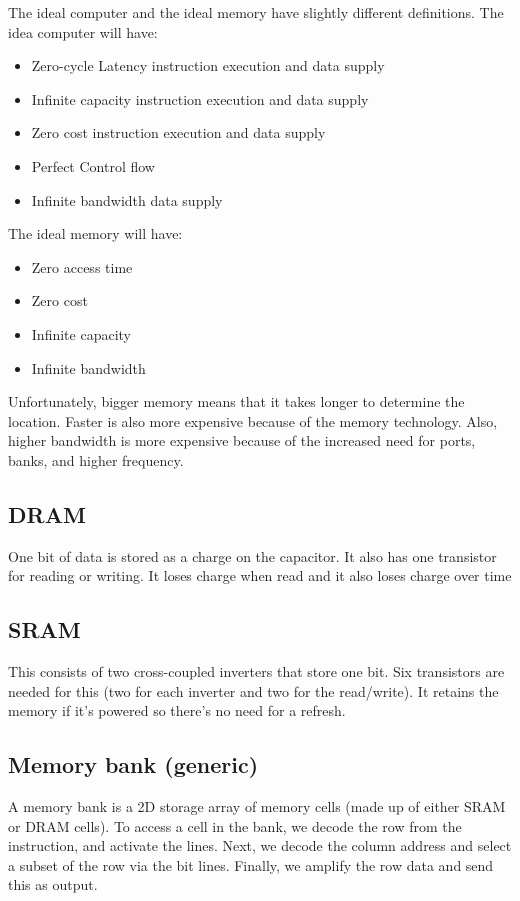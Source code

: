 \documentclass[11pt,a4paper,titlepage,dvipsnames,cmyk]{scrartcl}
\begin{document}
The ideal computer and the ideal memory have slightly different
definitions. The idea computer will have:

\begin{itemize}
    \item Zero-cycle Latency instruction execution and data supply
    \item Infinite capacity instruction execution and data supply
    \item Zero cost instruction execution and data supply
    \item Perfect Control flow
    \item Infinite bandwidth data supply
\end{itemize}

The ideal memory will have:

\begin{itemize}
    \item Zero access time
    \item Zero cost
    \item Infinite capacity
    \item Infinite bandwidth
\end{itemize}

Unfortunately, bigger memory means that it takes longer to determine the
location. Faster is also more expensive because of the memory technology.
Also, higher bandwidth is more expensive because of the increased need for
ports, banks, and higher frequency.

\subsection{DRAM}%
\label{sub:DRAM}
One bit of data is stored as a charge on the capacitor. It also has one
transistor for reading or writing. It loses charge when read and it also
loses charge over time

\subsection{SRAM}%
\label{sub:SRAM}
This consists of two cross-coupled inverters that store one bit. Six
transistors are needed for this (two for each inverter and two for the
read/write). It retains the memory if it's powered so there's no need for
a refresh.

\subsection{Memory bank (generic)}%
\label{sub:memory-bank}
A memory bank is a 2D storage array of memory cells (made up of either
SRAM or DRAM cells). To access a cell in the bank, we decode the row from
the instruction, and activate the lines. Next, we decode the column
address and select a subset of the row via the bit lines. Finally, we
amplify the row data and send this as output.
\end{document}
